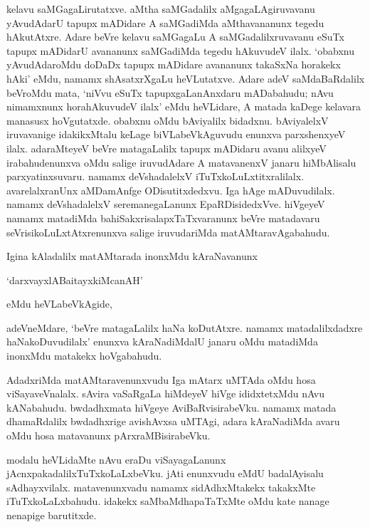 kelavu saMGagaLirutatxve. aMtha saMGadalilx aMgagaLAgiruvavanu yAvudAdarU tapupx mADidare A saMGadiMda aMthavananunx tegedu hAkutAtxre. Adare beVre kelavu saMGagaLu A saMGadalilxruvavanu eSuTx tapupx mADidarU avananunx saMGadiMda tegedu hAkuvudeV ilalx. `obabxnu yAvudAdaroMdu doDaDx tapupx mADidare avananunx takaSxNa horakekx hAki' eMdu, namamx shAsatxrXgaLu heVLutatxve. Adare adeV saMdaBaRdalilx beVroMdu mata, `niVvu eSuTx tapupxgaLanAnxdaru mADabahudu; nAvu nimamxnunx horahAkuvudeV ilalx' eMdu heVLidare, A matada kaDege kelavara manasusx hoVgutatxde. obabxnu oMdu bAviyalilx bidadxnu. bAviyalelxV iruvavanige idakikxMtalu keLage biVLabeVkAguvudu enunxva parxshenxyeV ilalx. adaraMteyeV beVre matagaLalilx tapupx mADidaru avanu alilxyeV irabahudenunxva oMdu salige iruvudAdare A matavanenxV janaru hiMbAlisalu parxyatinxsuvaru. namamx deVshadalelxV iTuTxkoLuLxtitxralilalx. avarelalxranUnx aMDamAnfge ODisutitxdedxvu. Iga hAge mADuvudilalx. namamx deVshadalelxV seremanegaLanunx EpaRDisidedxVve. hiVgeyeV namamx matadiMda 
bahiSakxrisalapxTaTxvaranunx beVre matadavaru seVrisikoLuLxtAtxrenunxva salige iruvudariMda matAMtaravAgabahudu.

Igina kAladalilx matAMtarada inonxMdu kAraNavanunx

`darxvayxlABaitayxkiMcanAH'

 eMdu heVLabeVkAgide,
 
adeVneMdare, `beVre matagaLalilx haNa koDutAtxre. namamx matadalilxdadxre haNakoDuvudilalx' enunxva kAraNadiMdalU janaru oMdu matadiMda inonxMdu matakekx hoVgabahudu.

AdadxriMda matAMtaravenunxvudu Iga mAtarx uMTAda oMdu hosa viSayaveVnalalx. sAvira vaSaRgaLa hiMdeyeV hiVge ididxtetxMdu nAvu kANabahudu. bwdadhxmata hiVgeye AviBaRvisirabeVku. namamx matada dhamaRdalilx bwdadhxrige avishAvxsa uMTAgi, adara kAraNadiMda avaru oMdu 
hosa matavanunx pArxraMBisirabeVku.

modalu heVLidaMte nAvu eraDu viSayagaLanunx jAcnxpakadalilxTuTxkoLaLxbeVku. jAti enunxvudu eMdU badalAyisalu sAdhayxvilalx. matavenunxvadu namamx sidAdhxMtakekx takakxMte iTuTxkoLaLxbahudu. idakekx saMbaMdhapaTaTxMte oMdu kate nanage nenapige barutitxde.

